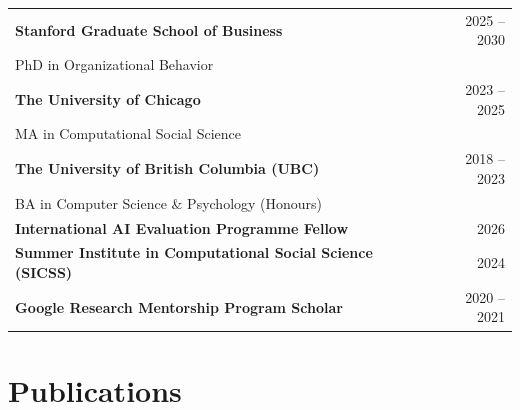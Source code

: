 \documentclass[11pt,letterpaper]{article}
\newcommand{\institution}[1]{\textcolor{accent}{\textbf{#1}}}
\begin{document}
\noindent
\begin{tabularx}{\textwidth}{Xr}
\institution{Stanford Graduate School of Business} & 2025 -- 2030 \\
\quad PhD in Organizational Behavior & \\[0.3em]
\institution{The University of Chicago} & 2023 -- 2025 \\
\quad MA in Computational Social Science & \\[0.3em]
\institution{The University of British Columbia (UBC)} & 2018 -- 2023 \\
\quad BA in Computer Science \& Psychology (Honours) & \\[0.3em]
\institution{International AI Evaluation Programme Fellow} & 2026 \\[0.3em]
\institution{Summer Institute in Computational Social Science (SICSS)} & 2024 \\[0.3em]
\institution{Google Research Mentorship Program Scholar} & 2020 -- 2021 \\
\end{tabularx}

\section*{Publications}
\end{document}
